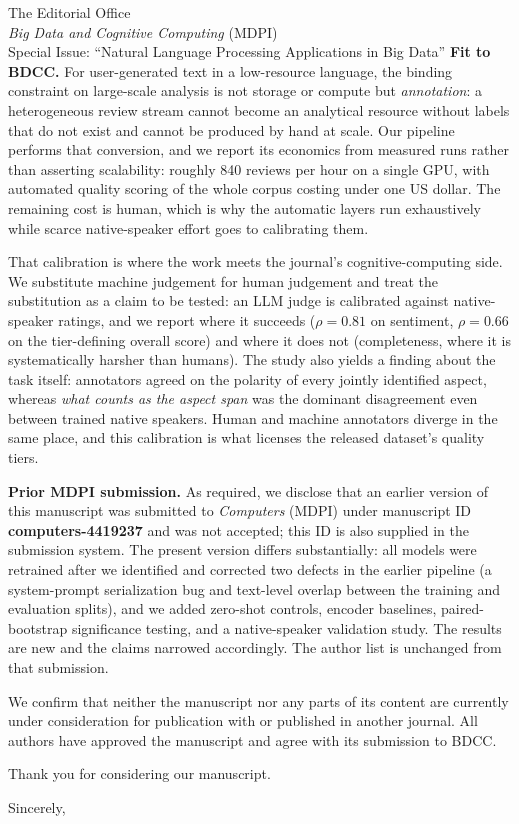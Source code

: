 \documentclass[11pt]{letter}
\begin{document}
\begin{letter}{%
  The Editorial Office\\
  \textit{Big Data and Cognitive Computing} (MDPI)\\
  Special Issue: ``Natural Language Processing Applications in Big Data''}
\textbf{Fit to BDCC.} For user-generated text in a low-resource language, the binding constraint on large-scale analysis is not storage or compute but \emph{annotation}: a heterogeneous review stream cannot become an analytical resource without labels that do not exist and cannot be produced by hand at scale. Our pipeline performs that conversion, and we report its economics from measured runs rather than asserting scalability: roughly 840 reviews per hour on a single GPU, with automated quality scoring of the whole corpus costing under one US dollar. The remaining cost is human, which is why the automatic layers run exhaustively while scarce native-speaker effort goes to calibrating them.

That calibration is where the work meets the journal's cognitive-computing side. We substitute machine judgement for human judgement and treat the substitution as a claim to be tested: an LLM judge is calibrated against native-speaker ratings, and we report where it succeeds ($\rho=0.81$ on sentiment, $\rho=0.66$ on the tier-defining overall score) and where it does not (completeness, where it is systematically harsher than humans). The study also yields a finding about the task itself: annotators agreed on the polarity of every jointly identified aspect, whereas \emph{what counts as the aspect span} was the dominant disagreement even between trained native speakers. Human and machine annotators diverge in the same place, and this calibration is what licenses the released dataset's quality tiers.

\textbf{Prior MDPI submission.} As required, we disclose that an earlier version of this manuscript was submitted to \textit{Computers} (MDPI) under manuscript ID \textbf{computers-4419237} and was not accepted; this ID is also supplied in the submission system. The present version differs substantially: all models were retrained after we identified and corrected two defects in the earlier pipeline (a system-prompt serialization bug and text-level overlap between the training and evaluation splits), and we added zero-shot controls, encoder baselines, paired-bootstrap significance testing, and a native-speaker validation study. The results are new and the claims narrowed accordingly. The author list is unchanged from that submission.

We confirm that neither the manuscript nor any parts of its content are currently under consideration for publication with or published in another journal. All authors have approved the manuscript and agree with its submission to BDCC.

Thank you for considering our manuscript.

\closing{Sincerely,}

\end{letter}
\end{document}
